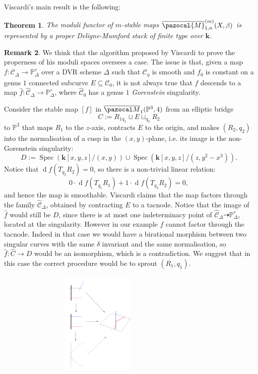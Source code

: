 \documentclass[11pt]{amsart}
\newcommand{\PP}{\mathbb P}
\renewcommand{\k}{\mathbf k}
\renewcommand{\to}{\rightarrow}
\newcommand{\cC}{\mathcal C}
\newcommand{\hC}{\widehat{\mathcal C}}
\newcommand{\oM}{\overline{\pazocal M}}
\newcommand{\dvr}{\Delta}
\theoremstyle{plain}
\newtheorem{thm}{Theorem}[section]
\theoremstyle{definition}
\newtheorem{remark}[thm]{Remark}
\begin{document}
 Viscardi's main result \cite[Theorem~3.6]{VISC} is the following:
\begin{thm}
The moduli functor of $m$-stable maps  $\overline{\pazocal{M}}^{(m)}_{1,n}(X,\beta)$ is represented by a proper Deligne-Mumford stack of finite type over $\k$.
\end{thm}
\begin{remark}\label{remark:sprouting}
We think that the algorithm proposed by Viscardi to prove the properness of his moduli spaces oversees a case. The issue is that, given a map $f\colon \cC_\dvr\to\PP^r_\dvr$ over a DVR scheme $\dvr$ such that $\cC_\eta$ is smooth and $f_0$ is constant on a genus $1$ connected subcurve $E\subseteq \cC_0$, it is not always true that $f$ descends to a map $\hat f\colon \hC_\dvr\to\PP^r_\dvr$, where $\hC_0$ has a genus $1$ \emph{Gorenstein} singularity.%

Consider the stable map $[f]$ in $\oM_{1}(\PP^3,4)$ from an elliptic bridge \[C:=R_1{}_{q_1}\!\sqcup E\sqcup_{q_2} R_2\] to $\PP^3$ that maps $R_1$ to the $z$-axis, contracts $E$ to the origin, and makes $(R_2,q_2)$ into the normalisation of a cusp in the $(x,y)$-plane, i.e. its image is the non-Gorenstein singularity:
\[D:=\operatorname{Spec}\left(\k[x,y,z]/(x,y)\right)\cup \operatorname{Spec}\left(\k[x,y,z]/(z,y^2-x^3)\right).\] 
Notice that $\operatorname{d}\!f(T_{q_2}R_2)=0$, so there is a non-trivial linear relation:
\[0\cdot\operatorname{d}\!f(T_{q_1}R_1)+1\cdot\operatorname{d}\!f(T_{q_2}R_2)=0,\]
and hence the map is smoothable. Viscardi claims that the map factors through the family $\hC_\dvr$, obtained by contracting $E$ to a tacnode. Notice that the image of $\hat f$ would still be $D$, since there is at most one indeterminacy point of $\hC_\dvr\dashrightarrow\PP^r_\dvr$, located at the singularity. However in our example $f$ cannot factor through the tacnode. Indeed in that case we would have a birational morphism between two singular curves with the same $\delta$ invariant and the same normalisation, so $\hat f\colon \widehat C\to D$ would be an isomorphism, which is a contradiction.
 We suggest that in this case the correct procedure would be to sprout $(R_1,q_1)$.
\begin{center}
\includegraphics[width=10cm,height=5cm]{cusp_line_transv.png}
\end{center}


\end{remark}
\end{document}
